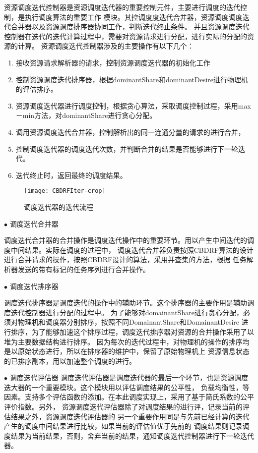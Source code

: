 资源调度迭代控制器是资源调度迭代器的重要控制元件，主要进行调度的迭代控制，是执行调度算法的重要工作
模块。其控调度度迭代合并器，资源调度调度迭代合并器以及资源调度排序器协同工作，判断迭代终止条件。
并且资源调度迭代控制器在迭代的迭代计算过程中，需要对资源请求进行分配，进行实际的分配的资源的计算。
资源调度迭代控制器涉及的主要操作有以下几个：
\begin{enumerate}
\item 接收资源请求解析器的请求，控制资源调度迭代器的初始化工作
\item 控制资源调度迭代排序器，根据dominantShare和dominantDesire进行物理机的评估排序。
\item 资源调度迭代器进行调度控制，根据贪心算法，采取调度控制过程，采用max－min方法，对dominantShare进行贪心分配。
\item 调用资源调度迭代合并器，控制解析出的同一连通分量的请求的进行合并，
\item 控制调度迭代器的调度迭代次数，并判断合并的结果是否能够进行下一轮迭代。
\item 迭代终止时，返回最终的调度结果。
\end{enumerate}
\begin{figure}[htbp]
\centering\texttt{[image: CBDRFIter-crop]}
\caption{调度迭代器的迭代流程}\label{fig:CBDRFIter}
\end{figure}


$\bullet$ 调度迭代合并器

调度迭代合并器的合并操作是调度迭代操作中的重要环节。用以产生中间迭代的调度中间结果。实际在调度的过程中，
调度迭代合并器负责按照CBDRF算法的设计进行合并请求的操作，按照CBDRF设计的算法，采用并查集的方法，根据
任务解析器发送的带有标记的任务序列进行合并操作。

$\bullet$ 调度迭代排序器

调度迭代排序器是调度迭代的操作中的辅助环节。这个排序器的主要作用是辅助调度迭代控制器进行分配的过程中。
为了能够对domainantShare进行贪心分配，必须对物理机和调度器分别排序，按照不同DomainantShare和DomainantDesire
进行排序，为了能够加速这个排序过程，调度迭代排序器对资源的合并操作采用了以堆为主要数据结构进行排序。
因为每次的迭代过程中，对物理机的操作的排序均是以原始状态进行，所以在排序器的维护中，保留了原始物理机上
资源信息状态的已排序副本，用以加速整个调度的进行。

$\bullet$  调度迭代评估器
调度迭代评估器是调度迭代器的最后一个环节，也是资源调度迭大器的一个重要模块。这个模块用以评估调度结果的公平性，
负载均衡性，等因素。支持多个评估函数的添加。在本此调度实现上，采用了基于简氏系数的公平评价指数。另外，
资源调度迭代评估器除了对调度结果的进行评，记录当前的评估结果之外，资源调度迭代评估器的
另一个重要作用同是与先前已经计算的迭代产生的调度中间结果进行比较，如果当前的评估值优于先前的
调度结果则记录调度结果为当前结果，否则，舍弃当前的结果，通知调度迭代控制器进行下一轮迭代器。

